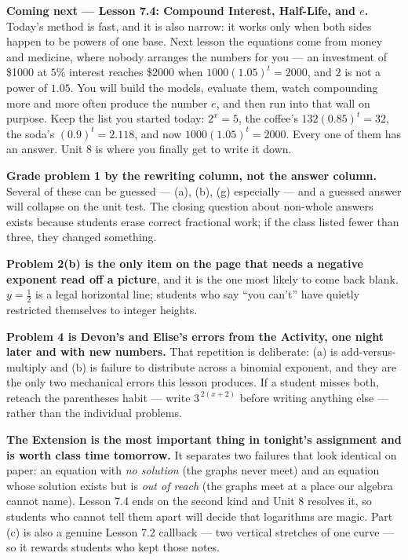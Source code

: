 \documentclass[10pt]{article}
\begin{document}
\begin{spiralbox}
\textbf{Coming next --- Lesson 7.4: Compound Interest, Half-Life, and $e$.} Today's method is fast, and
it is also narrow: it works only when both sides happen to be powers of one base. Next lesson the
equations come from money and medicine, where nobody arranges the numbers for you --- an investment of
\$1000 at $5\%$ interest reaches \$2000 when $1000(1.05)^{t}=2000$, and $2$ is not a power of $1.05$.
You will build the models, evaluate them, watch compounding more and more often produce the number
$e$, and then run into that wall on purpose. Keep the list you started today: $2^{x}=5$, the coffee's
$132(0.85)^{t}=32$, the soda's $(0.9)^{t}=2.118$, and now $1000(1.05)^{t}=2000$. Every one of them has
an answer. Unit 8 is where you finally get to write it down.
\end{spiralbox}

\begin{teachernote}
\textbf{Grade problem 1 by the rewriting column, not the answer column.} Several of these can be
guessed --- (a), (b), (g) especially --- and a guessed answer will collapse on the unit test. The
closing question about non-whole answers exists because students erase correct fractional work; if the
class listed fewer than three, they changed something.

\textbf{Problem 2(b) is the only item on the page that needs a negative exponent read off a picture},
and it is the one most likely to come back blank. $y=\frac12$ is a legal horizontal line; students who
say ``you can't'' have quietly restricted themselves to integer heights.

\textbf{Problem 4 is Devon's and Elise's errors from the Activity, one night later and with new
numbers.} That repetition is deliberate: (a) is add-versus-multiply and (b) is failure to distribute
across a binomial exponent, and they are the only two mechanical errors this lesson produces. If a
student misses both, reteach the parentheses habit --- write $3^{\,2(x+2)}$ before writing anything
else --- rather than the individual problems.

\textbf{The Extension is the most important thing in tonight's assignment and is worth class time
tomorrow.} It separates two failures that look identical on paper: an equation with \emph{no solution}
(the graphs never meet) and an equation whose solution exists but is \emph{out of reach} (the graphs
meet at a place our algebra cannot name). Lesson 7.4 ends on the second kind and Unit 8 resolves it, so
students who cannot tell them apart will decide that logarithms are magic. Part (c) is also a genuine
Lesson 7.2 callback --- two vertical stretches of one curve --- so it rewards students who kept those
notes.
\end{teachernote}
\end{document}
